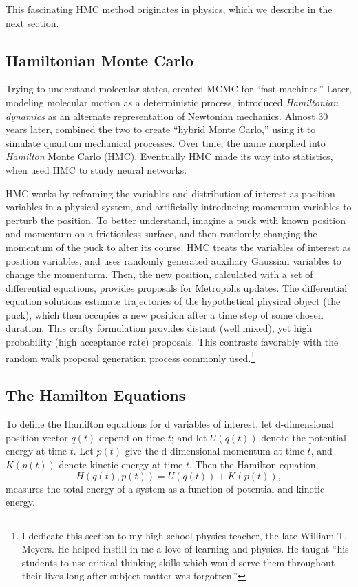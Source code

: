 This fascinating HMC method originates in physics, which we describe in the next section.

\subsection{Hamiltonian Monte Carlo} 

Trying to understand molecular states, \cite{Metropolis1953} created MCMC for ``fast machines.'' Later, modeling molecular motion as a deterministic process, \cite{Alder1959} introduced {\it Hamiltonian dynamics} as an alternate representation of Newtonian mechanics. Almost 30 years later, \cite{Duane1987} combined the two to create ``hybrid Monte Carlo,'' using it to simulate quantum mechanical processes. Over time, the name morphed into {\it Hamilton} Monte Carlo (HMC). Eventually HMC made its way into statistics, when \cite{Neal1996} used HMC to study neural networks.

HMC works by reframing the variables and distribution of interest as position variables in a physical system, and artificially introducing momentum variables to perturb the position. To better understand, imagine a puck with known position and momentum on a frictionless surface, and then randomly changing the momentum of the puck to alter its course. HMC treats the variables of interest as position variables, and uses randomly generated auxiliary Gaussian variables to change the momenturm. Then, the new position, calculated with a set of differential equations, provides proposals for Metropolis updates. The differential equation solutions estimate trajectories of the hypothetical physical object (the puck), which then occupies a new position after a time step of some chosen duration. This crafty formulation provides distant (well mixed), yet high probability (high acceptance rate) proposals. This contrasts favorably with the random walk proposal generation process commonly used.\footnote{I dedicate this section to my high school physics teacher, the late William T. Meyers. He helped instill in me a love of learning and physics. He taught ``his students to use critical thinking skills which would serve them throughout their lives long after subject matter was forgotten.''}

\subsection{The Hamilton Equations} %

To define the Hamilton equations for d variables of interest, let d-dimensional position vector $q(t)$ depend on time $t$; and let $U(q(t))$ denote the potential energy at time $t$. Let $p(t)$ give the d-dimensional momentum at time $t$, and $K(p(t))$ denote kinetic energy at time $t$. Then the Hamilton equation,
\begin{equation}
H(q(t),p(t)) = U(q(t)) + K(p(t)),
\end{equation}
measures the total energy of a system as a function of potential and kinetic energy. 

